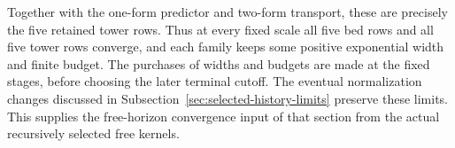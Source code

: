 Together with the one-form predictor and two-form transport, these
are precisely the five retained tower rows. Thus at every fixed
scale all five bed rows and all five tower rows converge, and each
family keeps some positive exponential width and finite budget.
The purchases of widths and budgets are made at the fixed stages,
before choosing the later terminal cutoff. The eventual
normalization changes discussed in
Subsection~\ref{sec:selected-history-limits} preserve these limits.
This supplies the free-horizon convergence input of that section
from the actual recursively selected free kernels.
